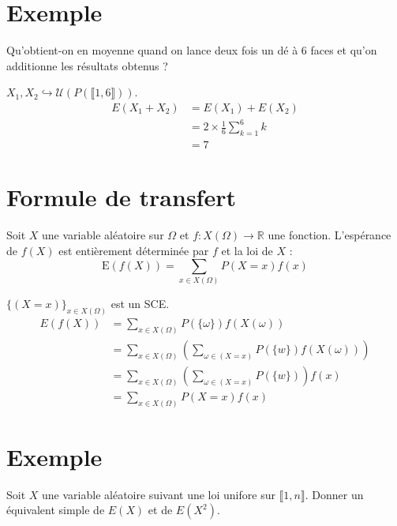 \documentclass[../main.tex]{subfiles}
\begin{document}
\section{Exemple}
\begin{tcolorbox}[title=Exemple 33.7, title filled=false, colframe=darkgreen, colback=darkgreen!10!white]
    Qu'obtient-on en moyenne quand on lance deux fois un dé à 6 faces et qu'on additionne les résultats obtenus ?
\end{tcolorbox}

\noindent $X_1, X_2 \hookrightarrow \mathcal{U}(P(\llbracket 1, 6 \rrbracket))$. 
\begin{align*}
    E(X_1 + X_2) &= E(X_1) + E(X_2) \\
    &= 2\times \frac{1}{6} \sum_{k=1}^{6} k \\
    &= 7
\end{align*}

\section{Formule de transfert}
\begin{tcolorbox}[title=Théorème 33.8, title filled=false, colframe=orange, colback=orange!10!white]
    Soit $X$ une variable aléatoire sur $\Omega$ et $f: X(\Omega) \rightarrow \mathbb{R}$ une fonction. L'espérance de $f(X)$ est entièrement déterminée par $f$ et la loi de $X$ :
    $$\mathrm{E}(f(X))=\sum_{x \in X(\Omega)} P(X=x) f(x)$$
\end{tcolorbox}

\noindent $\{(X = x)\}_{x\in X(\Omega)}$ est un SCE. 
\begin{align*}
    E(f(X)) &= \sum_{x\in X(\Omega)} P(\{\omega\}) f(X(\omega)) \\
    &= \sum_{x\in X(\Omega)} \left( \sum_{\omega\in (X=x)} P(\{w\}) f(X(\omega)) \right) \\
    &= \sum_{x\in X(\Omega)} \left( \sum_{\omega\in (X = x)} P(\{w\}) \right) f(x) \\
    &= \sum_{x\in X(\Omega)} P(X=x) f(x)
\end{align*}

\section{Exemple}
\begin{tcolorbox}[title=Exemple 33.10, title filled=false, colframe=darkgreen, colback=darkgreen!10!white]
    Soit $X$ une variable aléatoire suivant une loi unifore sur $\llbracket 1, n \rrbracket$. Donner un équivalent simple de $E(X)$ et de $E(X^2)$. 
\end{tcolorbox}
\end{document}
